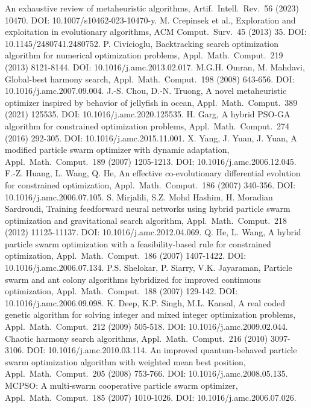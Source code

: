 \documentclass[review]{elsarticle}
\theoremstyle{definition}
\begin{document}
\begin{enumerate}
 An exhaustive review of metaheuristic algorithms, Artif.\ Intell.\ Rev.\ 56 (2023) 10470. DOI: 10.1007/s10462-023-10470-y.
 M. Crepinsek et al., Exploration and exploitation in evolutionary algorithms, ACM Comput.\ Surv.\ 45 (2013) 35. DOI: 10.1145/2480741.2480752.
 P. Civicioglu, Backtracking search optimization algorithm for numerical optimization problems, Appl.\ Math.\ Comput.\ 219 (2013) 8121-8144. DOI: 10.1016/j.amc.2013.02.017.
 M.G.H. Omran, M. Mahdavi, Global-best harmony search, Appl.\ Math.\ Comput.\ 198 (2008) 643-656. DOI: 10.1016/j.amc.2007.09.004.
 J.-S. Chou, D.-N. Truong, A novel metaheuristic optimizer inspired by behavior of jellyfish in ocean, Appl.\ Math.\ Comput.\ 389 (2021) 125535. DOI: 10.1016/j.amc.2020.125535.
 H. Garg, A hybrid PSO-GA algorithm for constrained optimization problems, Appl.\ Math.\ Comput.\ 274 (2016) 292-305. DOI: 10.1016/j.amc.2015.11.001.
 X. Yang, J. Yuan, J. Yuan, A modified particle swarm optimizer with dynamic adaptation, Appl.\ Math.\ Comput.\ 189 (2007) 1205-1213. DOI: 10.1016/j.amc.2006.12.045.
 F.-Z. Huang, L. Wang, Q. He, An effective co-evolutionary differential evolution for constrained optimization, Appl.\ Math.\ Comput.\ 186 (2007) 340-356. DOI: 10.1016/j.amc.2006.07.105.
 S. Mirjalili, S.Z. Mohd Hashim, H. Moradian Sardroudi, Training feedforward neural networks using hybrid particle swarm optimization and gravitational search algorithm, Appl.\ Math.\ Comput.\ 218 (2012) 11125-11137. DOI: 10.1016/j.amc.2012.04.069.
 Q. He, L. Wang, A hybrid particle swarm optimization with a feasibility-based rule for constrained optimization, Appl.\ Math.\ Comput.\ 186 (2007) 1407-1422. DOI: 10.1016/j.amc.2006.07.134.
 P.S. Shelokar, P. Siarry, V.K. Jayaraman, Particle swarm and ant colony algorithms hybridized for improved continuous optimization, Appl.\ Math.\ Comput.\ 188 (2007) 129-142. DOI: 10.1016/j.amc.2006.09.098.
 K. Deep, K.P. Singh, M.L. Kansal, A real coded genetic algorithm for solving integer and mixed integer optimization problems, Appl.\ Math.\ Comput.\ 212 (2009) 505-518. DOI: 10.1016/j.amc.2009.02.044.
 Chaotic harmony search algorithms, Appl.\ Math.\ Comput.\ 216 (2010) 3097-3106. DOI: 10.1016/j.amc.2010.03.114.
 An improved quantum-behaved particle swarm optimization algorithm with weighted mean best position, Appl.\ Math.\ Comput.\ 205 (2008) 753-766. DOI: 10.1016/j.amc.2008.05.135.
 MCPSO: A multi-swarm cooperative particle swarm optimizer, Appl.\ Math.\ Comput.\ 185 (2007) 1010-1026. DOI: 10.1016/j.amc.2006.07.026.

\end{enumerate}
\end{document}
